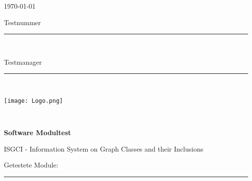 

\thispagestyle{empty} %


\begin{minipage}[l]{0.6\textwidth}
{\large \today}\\

{\large Testnummer \rule{1cm}{0.4pt}}\\

{\large Testmanager \rule{4cm}{0.4pt}}\\

\end{minipage}
\begin{minipage}{0.4\textwidth}
\texttt{[image: Logo.png]}
\end{minipage}\\


\vspace*{1cm} 
\begin{center}
\textbf{{\LARGE Software Modultest}}\\
\end{center}

\begin{center}
{\large ISGCI - Information System on Graph Classes and their Inclusions}\\
\end{center}

\begin{center}
{\large Getestete Module: \rule{4cm}{0.4pt}}\\
\end{center}

$ $\\

	\hspace{1cm}
\\
	
